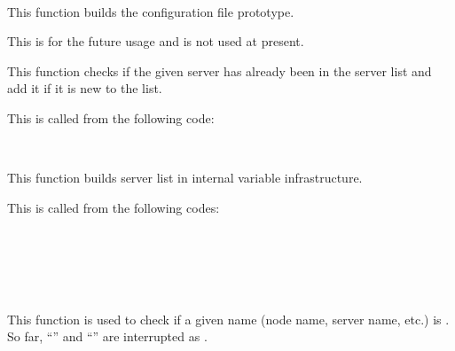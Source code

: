       \FuncRefHdr
      \\ \hline
      \FuncRefTrailor
  
  
      This function builds the configuration file prototype.
      
      This is for the future usage and is not used at present.
  
  
      This function checks if the given server has already been in
      the server list and add it if it is new to the list.
      
      This is called from the following code:
      
      \FuncRefHdr
		  \\ \hline
      \FuncRefTrailor
  
  
      This function builds \XC{} server list in internal variable infrastructure.
      
      This is called from the following codes:
      
      \FuncRefHdr
		  \\ \vspace{3pt}
		  \\ \vspace{3pt}
		  \\ \vspace{3pt}
		  \\ \hline
      \FuncRefTrailor
  
  
      This function is used to check if a given name (node name, server name, etc.) is .
      So far, ``'' and ``'' are interrupted as .
      
